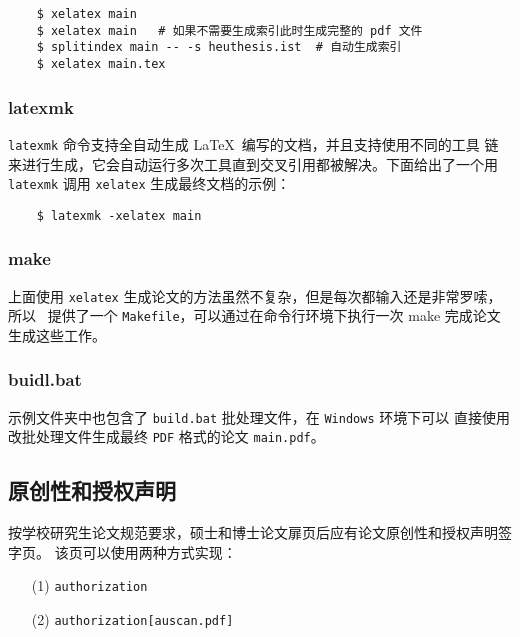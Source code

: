 \begin{lstlisting}
    $ xelatex main
    $ xelatex main   # 如果不需要生成索引此时生成完整的 pdf 文件
    $ splitindex main -- -s heuthesis.ist  # 自动生成索引
    $ xelatex main.tex
\end{lstlisting}

\subsubsection{latexmk}
\label{sec:latexmk}

\texttt{latexmk} 命令支持全自动生成 \LaTeX\ 编写的文档，并且支持使用不同的工具
链来进行生成，它会自动运行多次工具直到交叉引用都被解决。下面给出了一个用
\texttt{latexmk} 调用 \texttt{xelatex} 生成最终文档的示例：

\begin{lstlisting}
    $ latexmk -xelatex main
\end{lstlisting}

\subsubsection{make}
\label{sec:make}

上面使用 \texttt{xelatex} 生成论文的方法虽然不复杂，但是每次都输入还是非常罗嗦，所以 \heuthesis\
提供了一个 \texttt{Makefile}，可以通过在命令行环境下执行一次 make 完成论文生成这些工作。

\subsubsection{buidl.bat}
\label{sec:build}

示例文件夹中也包含了 \texttt{build.bat} 批处理文件，在 \texttt{Windows} 环境下可以
直接使用改批处理文件生成最终 \texttt{PDF} 格式的论文 \texttt{main.pdf}。

\subsection{原创性和授权声明}
\label{sec:generate-auth}

按学校研究生论文规范要求，硕士和博士论文扉页后应有论文原创性和授权声明签字页。
该页可以使用两种方式实现：

\begin{enumerate}
  \item[(1)] \texttt{\cs authorization}
  \item[(2)] \texttt{\cs authorization[auscan.pdf]}
\end{enumerate}

